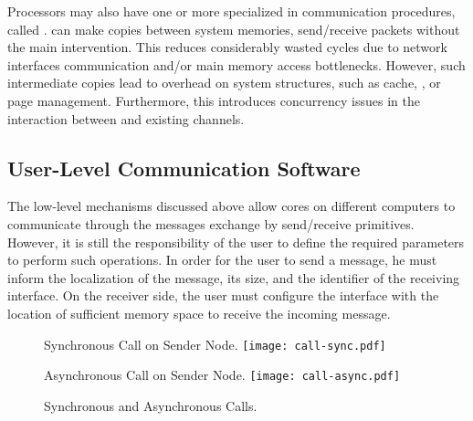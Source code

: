 			Processors may also have one or more \cpus specialized in
			communication procedures, called \dma.
			\dmas can make copies between system memories, send/receive packets
			without the main \cpus intervention.
			This reduces considerably wasted cycles due to network interfaces
			communication and/or main memory access bottlenecks.
			However, such intermediate copies lead to overhead on system structures,
			such as cache, \tlb, or page management.
			Furthermore, this introduces concurrency issues in the interaction between
			\cpus and existing \dma channels.

		\subsection{User-Level Communication Software}
		\label{sec.multicomputers-user-sw}

			The low-level mechanisms discussed above allow cores on different
			computers to communicate through the messages exchange by
			send/receive primitives.
			However, it is still the responsibility of the user to define the
			required parameters to perform such operations.
			In order for the user to send a message, he must inform the
			localization of the message, its size, and the identifier of the
			receiving interface.
			On the receiver side, the user must configure the interface with
			the location of sufficient memory space to receive the incoming message.

			\begin{figure}[!tb]
				\centering%
				\caption{Synchronous and Asynchronous Calls.}%
				\label{fig:calls-types}%

					{Synchronous Call on Sender Node.}%
					{\texttt{[image: call-sync.pdf]}}%

				\hfill

					{Asynchronous Call on Sender Node.}%
					{\texttt{[image: call-async.pdf]}}%

			\end{figure}

